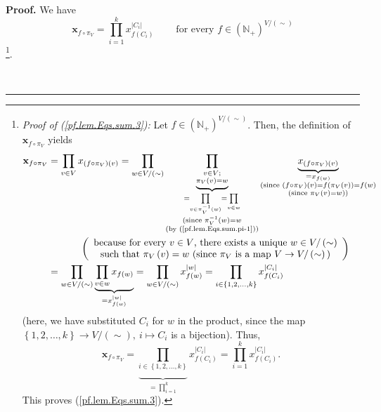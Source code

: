\documentclass[numbers=enddot,12pt,final,onecolumn,notitlepage]{scrartcl}%
\theoremstyle{definition}
\newenvironment{proof}[1][Proof]{\noindent\textbf{#1.} }{\ \rule{0.5em}{0.5em}}
\newenvironment{verlong}{}{}
\let\prodnonlimits\prod
\renewcommand{\prod}{\prodnonlimits\limits}
\begin{document}
\begin{verlong}
\begin{proof}
We have%
\begin{equation}
\mathbf{x}_{f\circ\pi_{V}}=\prod_{i=1}^{k}x_{f\left(  C_{i}\right)
}^{\left\vert C_{i}\right\vert }\ \ \ \ \ \ \ \ \ \ \text{for every }%
f\in\left(  \mathbb{N}_{+}\right)  ^{V/\left(  \sim\right)  }
\label{pf.lem.Eqs.sum.3}%
\end{equation}
\footnote{\textit{Proof of (\ref{pf.lem.Eqs.sum.3}):} Let $f\in\left(
\mathbb{N}_{+}\right)  ^{V/\left(  \sim\right)  }$. Then, the definition of
$\mathbf{x}_{f\circ\pi_{V}}$ yields%
\begin{align*}
\mathbf{x}_{f\circ\pi_{V}}  &  =\prod_{v\in V}x_{\left(  f\circ\pi_{V}\right)
\left(  v\right)  }=\prod_{w\in V/\left(  \sim\right)  }\underbrace{\prod
_{\substack{v\in V;\\\pi_{V}\left(  v\right)  =w}}}_{\substack{=\prod_{v\in
\pi_{V}^{-1}\left(  w\right)  }=\prod_{v\in w}\\\text{(since }\pi_{V}%
^{-1}\left(  w\right)  =w\\\text{(by (\ref{pf.lem.Eqs.sum.pi-1}))}%
}}\underbrace{x_{\left(  f\circ\pi_{V}\right)  \left(  v\right)  }%
}_{\substack{=x_{f\left(  w\right)  }\\\text{(since }\left(  f\circ\pi
_{V}\right)  \left(  v\right)  =f\left(  \pi_{V}\left(  v\right)  \right)
=f\left(  w\right)  \\\text{(since }\pi_{V}\left(  v\right)  =w\text{))}}}\\
&  \ \ \ \ \ \ \ \ \ \ \left(
\begin{array}
[c]{c}%
\text{because for every }v\in V\text{, there exists a unique }w\in V/\left(
\sim\right) \\
\text{such that }\pi_{V}\left(  v\right)  =w\text{ (since }\pi_{V}\text{ is a
map }V\rightarrow V/\left(  \sim\right)  \text{)}%
\end{array}
\right) \\
&  =\prod_{w\in V/\left(  \sim\right)  }\underbrace{\prod_{v\in w}x_{f\left(
w\right)  }}_{=x_{f\left(  w\right)  }^{\left\vert w\right\vert }}=\prod_{w\in
V/\left(  \sim\right)  }x_{f\left(  w\right)  }^{\left\vert w\right\vert
}=\prod_{i\in\left\{  1,2,\ldots,k\right\}  }x_{f\left(  C_{i}\right)
}^{\left\vert C_{i}\right\vert }%
\end{align*}
(here, we have substituted $C_{i}$ for $w$ in the product, since the map
$\left\{  1,2,\ldots,k\right\}  \rightarrow V/\left(  \sim\right)  ,\ i\mapsto
C_{i}$ is a bijection). Thus,%
\[
\mathbf{x}_{f\circ\pi_{V}}=\underbrace{\prod_{i\in\left\{  1,2,\ldots
,k\right\}  }}_{=\prod_{i=1}^{k}}x_{f\left(  C_{i}\right)  }^{\left\vert
C_{i}\right\vert }=\prod_{i=1}^{k}x_{f\left(  C_{i}\right)  }^{\left\vert
C_{i}\right\vert }.
\]
This proves (\ref{pf.lem.Eqs.sum.3}).}.


\end{proof}
\end{verlong}
\end{document}

